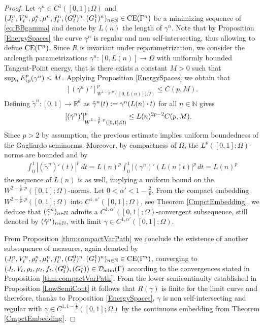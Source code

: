 \documentclass{article}
\def\R{{\mathbb R}}
\begin{document}
\begin{proof}   
    Let $\gamma^n \in C^{1}([0,1];\Omega)$ and $(J_t^n, V_t^n, \rho_t^n, \mu^n, f_t^n, (G_t^0)^n, (G_t^1)^n)_{n\in\mathbb{N}} \in {\rm CE}(\Gamma^n)$ be a minimizing sequence of \eqref{eq:BBgamma} and denote by $L(n)$ the length of $\gamma^n$. Note that by Proposition \ref{EnergySpaces} the curve $\gamma^n$ is regular and non self-intersecting, thus allowing to define ${\rm CE}(\Gamma^n)$.
    Since $R$ is invariant under reparametrization, we consider the arclength parametrizations $\gamma^n: [0,L(n)]\to\Omega$ with uniformly bounded Tangent-Point energy, that is there exists a constant $M>0$ such that $\sup_n E_{\rm tp}^p(\gamma^n) \leq M$.
    Applying Proposition \ref{EnergySpaces} we obtain that \begin{align}\label{eq:estimate2}
        [(\gamma^n)']^p_{W^{1 - \frac{1}{p}, p}([0,L(n)];\Omega)} \leq C(p,M).
    \end{align} 
    Defining $\tilde \gamma^n : [0,1]\to\R^d$ as $\Tilde{\gamma}^n(t) := \gamma^n(L(n)\cdot t)$ for all $n\in\mathbb{N}$ gives
    \begin{align}\label{eq:secone}
        [ (\Tilde{\gamma}^n)']^p_{W^{1-\frac{1}{p},p}([0,1];\Omega)} &\leq L(n)^{2p-2}C(p,M).
    \end{align}
    Since $p>2$ by assumption, the previous estimate implies uniform boundedness of the Gagliardo seminorms. 
    Moreover, by compactness of $\Omega$, the $L^p([0,1];\Omega)$-norms are bounded and by
    \begin{align}
    \int_0^1 |(\tilde \gamma^n)'(t)|^p\, dt =  L(n)^p \int_0^1 | (\gamma^n)'(L(n)t)|^p\, dt = L(n)^p  
    \end{align}
    the sequence of $L(n)$ is as well, implying a uniform bound on the $W^{2-\frac{1}{p},p}([0,1];\Omega)$-norms. 
    Let $0<\alpha'<1-\frac{2}{p}$. From the compact embedding $W^{2-\frac{1}{p},p}([0,1];\Omega)$ into $C^{1,\alpha'}([0,1];\Omega)$, see Theorem \ref{CmpctEmbedding}, we deduce that $(\Tilde{\gamma}^n)_{n\in\mathbb{N}}$ admits a $C^{1,\alpha'}([0,1];\Omega)$-convergent subsequence, still denoted by $(\Tilde{\gamma}^n)_{n\in\mathbb{N}}$, with limit $\gamma \in C^{1,\alpha'}([0,1];\Omega)$.

    
    From Proposition \ref{thm:compactVarPath} we conclude the existence of another subsequence of measures, again denoted by $(J_t^n, V_t^n, \rho_t^n, \mu_t^n, f_t^n, ({G_t^0})^n, ({G_t^1})^n)_{n\in\mathbb{N}} \in {\rm CE}(\Gamma^n)$, converging to $(J_t, V_t, \rho_t, \mu_t, f_t, ({G_t^0}), ({G_t^1})) \in \mathcal{D}_{\rm adm}(\Gamma)$ according to the convergences stated in Proposition \ref{thm:compactVarPath}. 
    From the lower semicontinuity established in Proposition \ref{LowSemiCont} it follows that $R(\gamma)$ is finite for the limit curve and therefore, thanks to Proposition \ref{EnergySpaces}, $\gamma$ is non self-intersecting and regular with $\gamma\in C^{1,1-\frac{2}{p}}([0,1];\Omega)$ by the continuous embedding from Theorem \ref{CmpctEmbedding}.
    

\end{proof}
\end{document}
